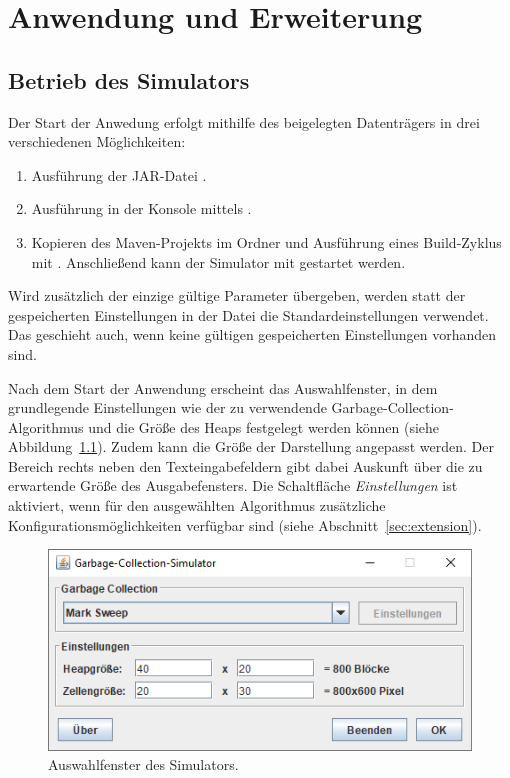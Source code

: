 \chapter{Anwendung und Erweiterung}
\label{cha:application}

\section{Betrieb des Simulators}
\label{sec:execution}
Der Start der Anwedung erfolgt mithilfe des beigelegten Datenträgers in drei verschiedenen Möglichkeiten:
\begin{enumerate}
	\item Ausführung der JAR-Datei .
	\item Ausführung in der Konsole mittels .
	\item Kopieren des Maven-Projekts im Ordner  und Ausführung eines Build-Zyklus mit .
	Anschließend kann der Simulator mit  gestartet werden.
\end{enumerate}

Wird zusätzlich der einzige gültige Parameter  übergeben, werden statt der gespeicherten Einstellungen in der Datei  die Standardeinstellungen verwendet.
Das geschieht auch, wenn keine gültigen gespeicherten Einstellungen vorhanden sind.

Nach dem Start der Anwendung erscheint das Auswahlfenster, in dem grundlegende Einstellungen wie der zu verwendende Garbage-Collection-Algorithmus und die Größe des Heaps festgelegt werden können (siehe Abbildung~\ref{fig:app-start}).
Zudem kann die Größe der Darstellung angepasst werden.
Der Bereich rechts neben den Texteingabefeldern gibt dabei Auskunft über die zu erwartende Größe des Ausgabefensters.
Die Schaltfläche \textit{Einstellungen} ist aktiviert, wenn für den ausgewählten Algorithmus zusätzliche Konfigurationsmöglichkeiten verfügbar sind (siehe Abschnitt~\ref{sec:extension}).

\begin{figure}[h]
	\centering
	\includegraphics[scale=0.5]{img/gui/selection.png}
	\caption[Auswahlfenster des Simulators]{Auswahlfenster des Simulators.}
	\label{fig:app-start}
\end{figure}

